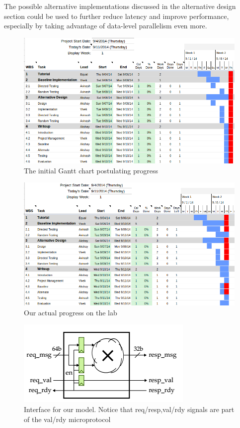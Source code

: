 \documentclass[11pt]{article}
\begin{document}
The possible alternative implementations discussed in the alternative design section could be used to further reduce latency and improve performance, especially by taking advantage of data-level parallelism even more.


\begin{figure}[b]
\centering
\includegraphics[scale=0.5]{gantt}
\caption{The initial Gantt chart postulating progress}
\label{fig:gantt}
\end{figure}

\begin{figure}[b]
\centering
\includegraphics[scale=0.5]{gantt_actual}
\caption{Our actual progress on the lab}
\label{fig:gantt_actual}
\end{figure}

\begin{figure}[b]
\centering
\includegraphics[scale=0.5]{FLmodel}
\caption{Interface for our model. Notice that req/resp,val/rdy signals are part of the val/rdy microprotocol}
\label{fig:model}
\end{figure}
\end{document}
